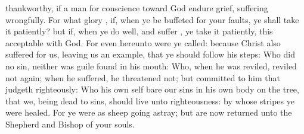 {{}
thankworthy,
if a
man
for
conscience toward
God
endure
grief,
suffering
wrongfully.
For
what
glory
{},
if,
when ye be
buffeted for your
faults, ye shall take it
patiently?
but
if, when ye do
well,
and
suffer
{}, ye take it
patiently,
this
{}
acceptable
with
God.
For
even
hereunto were ye
called:
because
Christ
also
suffered
for
us,
leaving
us an
example,
that ye should
follow
his
steps:
Who
did
no
sin,
neither
was
guile
found
in
his
mouth:
Who, when he was
reviled,
reviled
not
again; when he
suffered, he
threatened
not;
but
committed
{} to him that
judgeth
righteously:
Who his own
self
bare
our
sins
in his
own
body
on the
tree,
that
we, being
dead to
sins, should
live unto
righteousness: by
whose
stripes ye were
healed.
For ye
were
as
sheep going
astray;
but
are
now
returned
unto the
Shepherd
and
Bishop of
your
souls.

}
